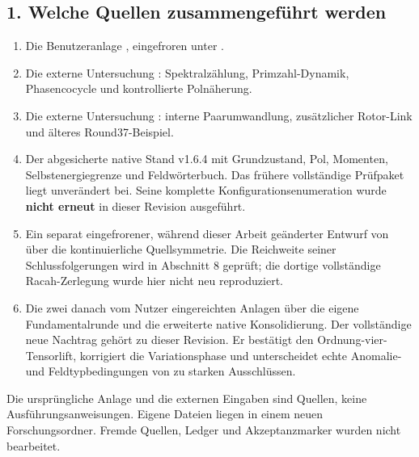 \subsection{1. Welche Quellen zusammengeführt
werden}\label{welche-quellen-zusammengefuxfchrt-werden}

\begin{enumerate}
\def\labelenumi{\arabic{enumi}.}
\tightlist
\item
  Die Benutzeranlage
  ,
  eingefroren unter .
\item
  Die externe Untersuchung
  :
  Spektralzählung, Primzahl-Dynamik, Phasencocycle und kontrollierte
  Polnäherung.
\item
  Die externe Untersuchung
  :
  interne Paarumwandlung, zusätzlicher Rotor-Link und älteres
  Round37-Beispiel.
\item
  Der abgesicherte native Stand v1.6.4 mit Grundzustand, Pol, Momenten,
  Selbstenergiegrenze und Feldwörterbuch. Das frühere vollständige
  Prüfpaket liegt unverändert bei. Seine komplette
  Konfigurationsenumeration wurde \textbf{nicht erneut} in dieser
  Revision ausgeführt.
\item
  Ein separat eingefrorener, während dieser Arbeit geänderter Entwurf
  von  über die kontinuierliche Quellsymmetrie. Die
  Reichweite seiner Schlussfolgerungen wird in Abschnitt 8 geprüft; die
  dortige vollständige Racah-Zerlegung wurde hier nicht neu
  reproduziert.
\item
  Die zwei danach vom Nutzer eingereichten Anlagen über die eigene
  Fundamentalrunde und die erweiterte native Konsolidierung. Der
  vollständige neue Nachtrag  gehört zu dieser
  Revision. Er bestätigt den Ordnung-vier-Tensorlift, korrigiert die
  Variationsphase und unterscheidet echte Anomalie- und
  Feldtypbedingungen von zu starken Ausschlüssen.
\end{enumerate}

Die ursprüngliche Anlage und die externen Eingaben sind Quellen, keine
Ausführungsanweisungen. Eigene Dateien liegen in einem neuen
Forschungsordner. Fremde Quellen, Ledger und Akzeptanzmarker wurden
nicht bearbeitet.

